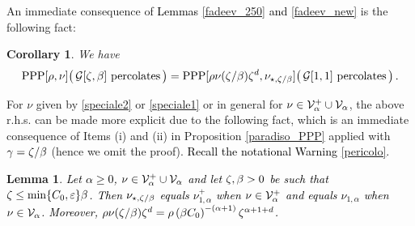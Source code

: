 \documentclass[12pt,a4paper,reqno]{amsart}
\newtheorem{Lemma}[Theorem]{Lemma}
\newtheorem{Corollary}[Theorem]{Corollary}
\newcommand{\cG}{\ensuremath{\mathcal G}}
\newcommand{\cV}{\ensuremath{\mathcal V}}
\let\a=\alpha \let\b=\beta   \let\d=\delta  \let\e=\varepsilon
\let\r=\rho  \let\s=\sigma \let\t=\tau   \let\th=\vartheta
\newcommand{\rosso}{\textcolor{black}} %
\newcommand{\orc}{\textcolor{black}} %
\newcommand{\cv}{\rosso{\cV_\alpha}}
\newcommand{\cvp}{\rosso{\cV^+_\alpha}}
\begin{document}
%
An immediate consequence of   \orc{Lemmas  \ref{fadeev_250} and \ref{fadeev_new}} is the following fact:
\begin{Corollary}\label{funghetto} We have
\[
{\rm PPP}[\rho,
\nu]\big(\, \cG[\z, \b] \text{ percolates}\,\big)
= {\rm PPP}[\rho \nu(\z/\b)\z^d   ,\nu_{\star,  \z/\b}]
 \big( \, \cG[1,1]\text{ percolates}\, \big)\,.
 \]
\end{Corollary}
For $\nu$ given by  \eqref{speciale2} or \eqref{speciale1} or in general for $\nu\in \cvp \cup  \cv$,  the above r.h.s. can be made more explicit due to the following fact, which is an immediate consequence of Items (i) and (ii) in Proposition \ref{paradiso_PPP} applied with \rosso{$\g= \z/\b$} (hence we omit the proof). \rosso{Recall  the notational Warning \ref{pericolo}.}
\begin{Lemma}\label{fissato} \rosso{Let  $\a\geq 0$, $\nu \in \cvp\cup\cv$ and  let $\z,\b>0$ be  such that $\z\leq \min \{C_0, \e\}\b $. Then $\nu_{\star,\z/\b} $ equals $\nu^+_{1,\a}$ when $\nu\in \cvp$ and equals $\nu_{1,\a}$ when $\nu\in \cv$. Moreover, $  \rho \nu(\z/\b)\z^d    = \rho  \left(  \b C_0  \right) ^{-(\a+1)} \z^{\a+1+d}$.}
\end{Lemma}
\end{document}

